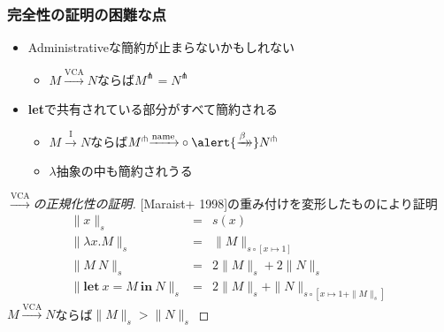 \documentclass[dvipdfmx,cjk,xcolor=dvipsnames,envcountsect,notheorems,12pt]{beamer}
\theoremstyle{definition}
\newcommand{\xtwoheadrightarrow}[2][]{%
  \xrightarrow[#1]{#2}\mathrel{\mkern-14mu}\rightarrow
}
\newcommand{\LET}[3]{\mathbf{let}~#1=#2~\mathbf{in}~#3}
\newcommand{\EXPANDLET}[1]{#1^\pitchfork}
\newcommand{\SIZE}[2]{\parallel #1 \parallel_{#2}}
\newcommand{\CALLBYNEEDI}{\xrightarrow{\mathrm{I}}}
\newcommand{\CALLBYNEEDVCA}{\xrightarrow{\mathrm{VCA}}}
\newcommand{\CALLBYNAME}{\xrightarrow{\mathrm{name}}}
\newcommand{\RTCLOSFULLBETA}{\xtwoheadrightarrow{\beta}}
\begin{document}
\begin{frame}
	\frametitle{完全性の証明の困難な点}
	\begin{itemize}
		\item Administrativeな簡約が止まらないかもしれない
			\begin{itemize}
				\item $M\CALLBYNEEDVCA N$ならば$\EXPANDLET{M}=\EXPANDLET{N}$
			\end{itemize}
		\item \textbf{let}で共有されている部分がすべて簡約される
			\begin{itemize}
				\item $M\CALLBYNEEDI N$ならば$\EXPANDLET{M}{\CALLBYNAME}\circ{\alert{\RTCLOSFULLBETA}}\EXPANDLET{N}$
				\item $\lambda$抽象の中も簡約されうる
			\end{itemize}
	\end{itemize}
\end{frame}

\begin{frame}
	\Large
	\begin{proof}[$\CALLBYNEEDVCA$の正規化性の証明]
		{[Maraist+ 1998]}の重み付けを変形したものにより証明
		{\normalsize \[ \begin{array}{rcl}
		\SIZE{x}{s} & = & s(x) \\
		\SIZE{\lambda x. M}{s} & = & \SIZE{M}{s \circ [x \mapsto 1]} \\
		\SIZE{M~N}{s} & = & 2\SIZE{M}{s}+2\SIZE{N}{s} \\
		\SIZE{\LET{x}{M}{N}}{s} & = & 2\SIZE{M}{s}+\SIZE{N}{s \circ [x \mapsto 1+\SIZE{M}{s}]}
		\end{array} \]}
		$M\CALLBYNEEDVCA N$ならば$\SIZE{M}{s}>\SIZE{N}{s}$
	\end{proof}
\end{frame}
\end{document}
